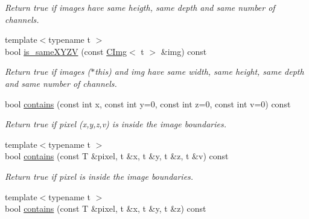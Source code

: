 \begin{DoxyCompactItemize}
\begin{DoxyCompactList}\small\item\em Return {\ttfamily true} if images have same heigth, same depth and same number of channels. \end{DoxyCompactList}\item 
\hypertarget{structcimg__library_1_1_c_img_a6a329f787c91dd0da259ef0641c6cf3f}{{\footnotesize template$<$typename t $>$ }\\bool \hyperlink{structcimg__library_1_1_c_img_a6a329f787c91dd0da259ef0641c6cf3f}{is\-\_\-same\-X\-Y\-Z\-V} (const \hyperlink{structcimg__library_1_1_c_img}{C\-Img}$<$ t $>$ \&img) const }\label{structcimg__library_1_1_c_img_a6a329f787c91dd0da259ef0641c6cf3f}

\begin{DoxyCompactList}\small\item\em Return {\ttfamily true} if images {\ttfamily }($\ast$this) and {\ttfamily img} have same width, same height, same depth and same number of channels. \end{DoxyCompactList}\item 
\hypertarget{structcimg__library_1_1_c_img_a4631fac1a1d17e6702c4c5ca4315bcbd}{bool \hyperlink{structcimg__library_1_1_c_img_a4631fac1a1d17e6702c4c5ca4315bcbd}{contains} (const int x, const int y=0, const int z=0, const int v=0) const }\label{structcimg__library_1_1_c_img_a4631fac1a1d17e6702c4c5ca4315bcbd}

\begin{DoxyCompactList}\small\item\em Return {\ttfamily true} if pixel (x,y,z,v) is inside the image boundaries. \end{DoxyCompactList}\item 
\hypertarget{structcimg__library_1_1_c_img_a0ab9406e02d3767257ce97d5079b6d27}{{\footnotesize template$<$typename t $>$ }\\bool \hyperlink{structcimg__library_1_1_c_img_a0ab9406e02d3767257ce97d5079b6d27}{contains} (const T \&pixel, t \&x, t \&y, t \&z, t \&v) const }\label{structcimg__library_1_1_c_img_a0ab9406e02d3767257ce97d5079b6d27}

\begin{DoxyCompactList}\small\item\em Return {\ttfamily true} if pixel is inside the image boundaries. \end{DoxyCompactList}\item 
\hypertarget{structcimg__library_1_1_c_img_a3fd2615429f6510b8c86d16503d36459}{{\footnotesize template$<$typename t $>$ }\\bool \hyperlink{structcimg__library_1_1_c_img_a3fd2615429f6510b8c86d16503d36459}{contains} (const T \&pixel, t \&x, t \&y, t \&z) const }\label{structcimg__library_1_1_c_img_a3fd2615429f6510b8c86d16503d36459}


\end{DoxyCompactItemize}
